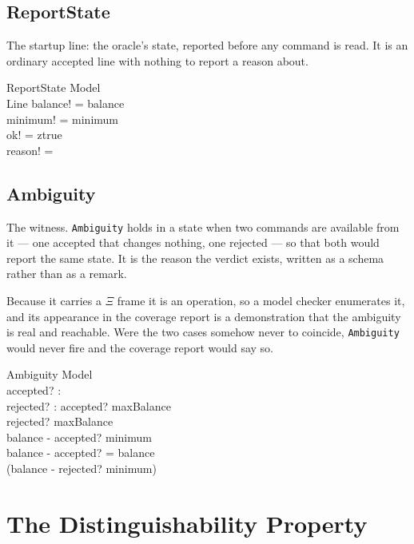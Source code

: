\documentclass[a4paper,10pt,fleqn]{article}
\begin{document}
\subsection{ReportState}

The startup line: the oracle's state, reported before any command is
read. It is an ordinary accepted line with nothing to report a reason
about.

\begin{schema}{ReportState}
  \Xi Model \\
  Line
  \where
  balance! = balance \\
  minimum! = minimum \\
  ok! = ztrue \\
  reason! = \emptyset
\end{schema}

\subsection{Ambiguity}

The witness. \texttt{Ambiguity} holds in a state when two commands are
available from it --- one accepted that changes nothing, one rejected ---
so that both would report the same state. It is the reason the verdict
exists, written as a schema rather than as a remark.

Because it carries a $\Xi$ frame it is an operation, so a model checker
enumerates it, and its appearance in the coverage report is a
demonstration that the ambiguity is real and reachable. Were the two
cases somehow never to coincide, \texttt{Ambiguity} would never fire and
the coverage report would say so.

\begin{schema}{Ambiguity}
  \Xi Model \\
  accepted? : \nat \\
  rejected? : \nat
  \where
  accepted? \leq maxBalance \\
  rejected? \leq maxBalance \\
  balance - accepted? \geq minimum \\
  balance - accepted? = balance \\
  \lnot (balance - rejected? \geq minimum)
\end{schema}

\section{The Distinguishability Property}
\end{document}
